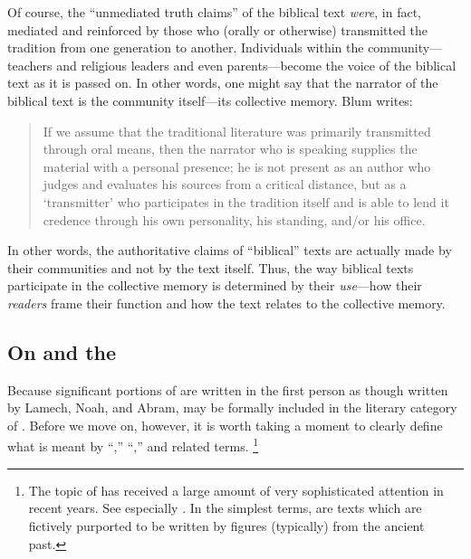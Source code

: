 Of course, the ``unmediated truth claims'' of the biblical text \emph{were}, in fact, mediated and reinforced by those who (orally or otherwise) transmitted the tradition from one generation to another.%
    \autocite[33]{blum_barton-etal2007}
Individuals within the community---teachers and religious leaders and even parents---become the voice of the biblical text as it is passed on. In other words, one might say that the narrator of the biblical text is the community itself---its collective memory. Blum writes:

\begin{quote}
    If we assume that the traditional literature was primarily transmitted through oral means, then the narrator who is speaking supplies the material with a personal presence; he is not present as an author who judges and evaluates his sources from a critical distance, but as a `transmitter' who participates in the tradition itself and is able to lend it credence through his own personality, his standing, and/or his office.\autocite[33]{blum_barton-etal2007}
\end{quote}
\noindent
In other words, the authoritative claims of ``biblical'' texts are actually made by their communities and not by the text itself. Thus, the way biblical texts participate in the collective memory is determined by their \emph{use}---how their \emph{readers} frame their function and how the text relates to the collective memory. 

\subsection{On \Psy and the \Psa}

Because significant portions of \ga are written in the first person as though written by Lamech, Noah, and Abram, \ga may be formally included in the literary category of \psy. Before we move on, however, it is worth taking a moment to clearly define what is meant by ``\psy,'' ``\psa,'' and related terms.%
    \footnote{The topic of \psy has received a large amount of very sophisticated attention in recent years. See especially
        \cite{mroczek2016}
        \cite{tigchelaar_tigchelaar2014}
        \cite{reed_towsend-moulie2011}
        \cite{reed_jts2009}
        \cite{reed_ditomasso-turcescu2008}
        \cite{najman_hilhorst-puech2007}
        \cite{najman2003}.
        In the simplest terms, \psa are texts which are fictively purported to be written by figures (typically) from the ancient past.}

